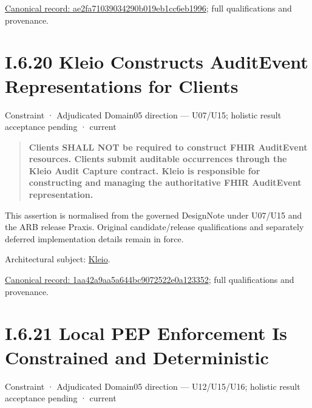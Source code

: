 {\footnotesize \href{../../../../../../../continuum/motivation/constraint/ae2fa71039034290b019eb1cc6eb1996.md}{Canonical record: ae2fa71039034290b019eb1cc6eb1996}; full qualifications and provenance.}\par
\section*{I.6.20 Kleio Constructs AuditEvent Representations for Clients}
\label{navigation:I.6.20}

\label{element:1aa42a9aa5a644bc9072522e0a123352}
{\small Constraint · Adjudicated Domain05 direction — U07/U15; holistic result acceptance pending · current}\par

\begin{quote}


\textbf{Clients SHALL NOT be required to construct FHIR AuditEvent resources. Clients submit auditable occurrences through the Kleio Audit Capture contract. Kleio is responsible for constructing and managing the authoritative FHIR AuditEvent representation.}



\end{quote}


This assertion is normalised from the governed DesignNote under U07/U15 and the ARB release Praxis. Original candidate/release qualifications and separately deferred implementation details remain in force.



Architectural subject: \hyperref[element:fefda110e2274884ad58906733606efd]{Kleio}.


{\footnotesize \href{../../../../../../../continuum/motivation/constraint/1aa42a9aa5a644bc9072522e0a123352.md}{Canonical record: 1aa42a9aa5a644bc9072522e0a123352}; full qualifications and provenance.}\par
\section*{I.6.21 Local PEP Enforcement Is Constrained and Deterministic}
\label{navigation:I.6.21}

\label{element:8c9ef077cb5d4cc9aacb55d743b1af92}
{\small Constraint · Adjudicated Domain05 direction — U12/U15/U16; holistic result acceptance pending · current}\par

